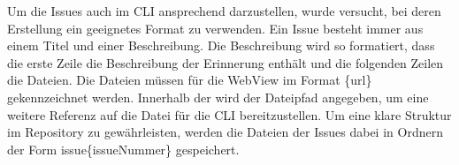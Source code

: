 \newline
\myNewSection
Um die Issues auch im CLI ansprechend darzustellen, wurde versucht, bei deren Erstellung ein geeignetes Format zu verwenden.%
\newline%
Ein Issue besteht immer aus einem Titel und einer Beschreibung. Die Beschreibung wird so formatiert, dass die erste Zeile die Beschreibung der Erinnerung enthält und die folgenden Zeilen die Dateien.%
\newline%
Die Dateien müssen für die WebView im Format \glqq [ ]\{url\}\grqq{} gekennzeichnet werden. Innerhalb der \glqq[ ]\grqq{} wird der Dateipfad angegeben, um eine weitere Referenz auf die Datei für die CLI bereitzustellen. %
Um eine klare Struktur im Repository zu gewährleisten, werden die Dateien der Issues dabei in Ordnern der Form \glqq issue\{issueNummer\}\grqq{} gespeichert.%
\myComment{

%
 

}